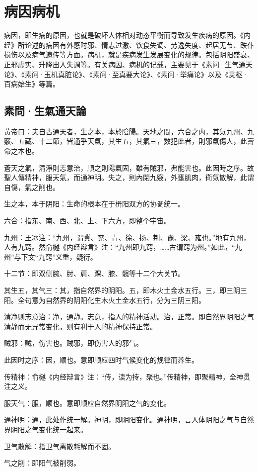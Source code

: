 \documentclass[draft,12pt]{ctexbook}
\begin{document}
\pagestyle{main2}
\fi
\chapter{病因病机}%

病因，即生病的原因，也就是破坏人体相对动态平衡而导致发生疾病的原因。《内经》所论述的病因有外感时邪、情志过激、饮食失调、劳逸失度、起居无节、跌仆损伤以及病气遗传等方面。病机，就是疾病发生发展变化的规律。包括阴阳盛衰、正邪虚实、升降出入失调等。有关病因、病机的记载，主要见于《素问·生气通天论》、《素问·玉机真脏论》、《素问·至真要大论》、《素问·举痛论》以及《灵枢·百病始生》等篇。

\section{素問·生氣通天論}%


\begin{yuanwen}
黃帝曰：夫自古通天者，生之本，本於陰陽。天地之間，六合之内，其氣九州、九竅、五藏、十二節，皆通乎天氣，其生五，其氣三，数犯此者，則邪氣傷人，此壽命之本也。

蒼天之氣，清淨則志意治，順之則陽氣固，雖有賊邪，弗能害也。此因時之序。故聖人傳精神，服天氣，而通神明。失之，則內閉九竅，外壅肌肉，衛氣散解，此谓自傷，氣之削也。
\end{yuanwen}


\begin{jiaozhu}
  \item 生之本，本于阴阳：生命的根本在于枬阳双方的协调统一。
  \item 六合：指东、南、西、北、上、下六方，即整个宇宙。
  \item 九州：王冰注：“九州，谓冀、兖、青、徐、扬、荆、豫、梁、雍也。”地有九州，人有九窍。然俞樾《内经辩言》注：“九州即九窍，……古谓窍为州。”如此，“九州”与下文“九窍”义重，疑衍。
  \item 十二节：即双侧腕、肘、肩、踝、膝、髋等十二个大关节。
  \item 其生五，其气三：其，指自然界的阴阳。五，即木火土金水五行。三，即三阴三阳。全句意为自然界的阴阳化生木火土金水五行，分为三阴三阳。
  \item 清净则志意治：净，通静。志意，指人的精神活动。治，正常。即自然界阴阳之气清静而无异常变化，则有利于人的精神保持正常。
  \item 贼邪：贼，伤害也。贼邪，即伤害人的邪气。
  \item 此因时之序：因，顺也。意即顺应四时气候变化的规律而养生。
  \item 传精神：俞樾《内经辩言》注：“传，读为抟，聚也。”传精神，即聚精神，全神贯注之义。
  \item 服天气：服，顺也。意即顺应自然界阴阳之气的变化。
  \item 通神明：通，此处作统一解。神明，即阴阳变化。通神明，言人体阴阳之气与自然界阴阳之气变化统一起来。
  \item 卫气散解：指卫气离散耗解而不固。
  \item 气之削：即阳气被削弱。
\end{jiaozhu}
\end{document}
